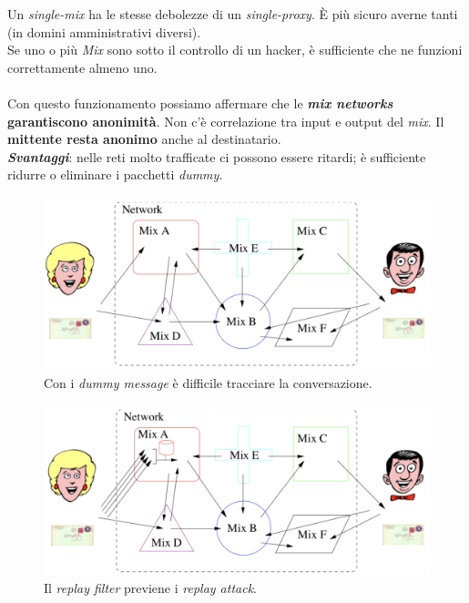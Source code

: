 \documentclass[11pt, a4paper, twoside, italian]{report}
\theoremstyle{plain}
\begin{document}
Un \textit{single-mix} ha le stesse debolezze di un \textit{single-proxy}. È più sicuro averne tanti (in domini amministrativi diversi).\\
Se uno o più \textit{Mix} sono sotto il controllo di un hacker, è sufficiente che ne funzioni correttamente almeno uno.\\\\
Con questo funzionamento possiamo affermare che le \textbf{\textit{mix networks} garantiscono anonimità}. Non c'è correlazione tra input e output del \textit{mix}. Il \textbf{mittente resta anonimo} anche al destinatario.\\
\textit{\textbf{Svantaggi}}: nelle reti molto trafficate ci possono essere ritardi; è sufficiente ridurre o eliminare i pacchetti \textit{dummy}.
\begin{multicols}{2}
\begin{figure}[H]
	\centering
	\includegraphics[scale=0.35]{dummy}
	\caption*{Con i \textit{dummy message} è difficile tracciare la conversazione.}
\end{figure}
\columnbreak
\setlength{\columnseprule}{0.4pt}
\begin{figure}[H]
	\centering
	\includegraphics[scale=0.35]{replay}
	\caption*{Il \textit{replay filter} previene i \textit{replay attack}.}
\end{figure}
\end{multicols}
\end{document}
